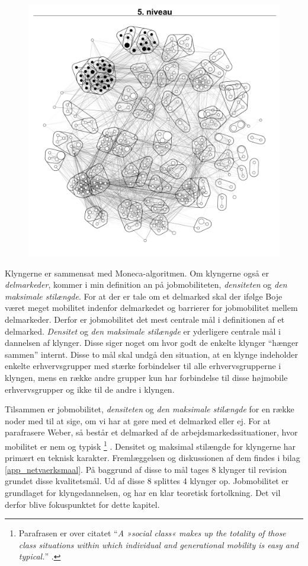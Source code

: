 \begin{figure}[H]
\begin{centering}
  \includegraphics[width=10 cm]{fig/netvaerkskort/kort_seg_proces5.pdf}
  \caption{}
  \label{fig_seg_proces5}
\end{centering}
\end{figure}

Klyngerne er sammensat med Moneca-algoritmen. Om klyngerne også er \emph{delmarkeder}, kommer i min definition an på jobmobiliteten, \emph{densiteten} og \emph{den maksimale stilængde}. For at der er tale om et delmarked skal der ifølge Boje været meget mobilitet indenfor delmarkedet og barrierer for jobmobilitet mellem  delmarkeder. Derfor er jobmobilitet det mest centrale mål i definitionen af et delmarked. \emph{Densitet} og \emph{den maksimale stilængde} er yderligere centrale mål i dannelsen af klynger. Disse siger noget om hvor godt de enkelte klynger “hænger sammen” internt. Disse to mål skal undgå den situation, at en klynge indeholder enkelte erhvervsgrupper med stærke forbindelser til alle erhvervsgrupperne i klyngen, mens en række andre grupper kun har forbindelse til disse højmobile erhvervsgrupper og ikke til de andre i klyngen. 

Tilsammen er jobmobilitet, \emph{densiteten} og \emph{den maksimale stilængde} for en række noder med til at sige, om vi har at gøre med et delmarked eller ej. For at parafrasere Weber, så består et delmarked af de arbejdsmarkedssituationer, hvor mobilitet er nem og typisk 
%
\footnote{Parafrasen er over citatet “\emph{A »social class« makes up the totality of those class situations within which individual and generational mobility is easy and typical.}” \parencite[302]{Weber1978}.}%
%
\parencite[302]{Weber1978}. Densitet og maksimal stilængde for klyngerne har primært en teknisk karakter. Fremlæggelsen og diskussionen af dem findes i bilag \ref{app_netvaerksmaal}. På baggrund af disse to mål tages 8 klynger til revision grundet disse kvalitetsmål. Ud af disse 8 splittes 4 klynger op. Jobmobilitet er grundlaget for klyngedannelsen, og har en  klar teoretisk fortolkning. Det vil derfor blive fokuspunktet for dette kapitel.

